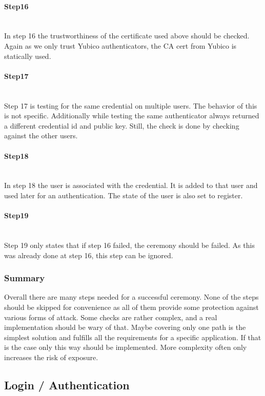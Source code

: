\documentclass[a4paper, 11pt]{scrartcl}
\begin{document}
\paragraph{Step16}\hfill \\ 
In step 16 the trustworthiness of the certificate used above should be checked. Again as we only trust Yubico authenticators, the CA cert from Yubico is statically used.

\paragraph{Step17}\hfill \\ 
Step 17 is testing for the same credential on multiple users. The behavior of this is not specific. Additionally while testing the same authenticator always returned a different credential id and public key. Still, the check is done by checking against the other users.

\paragraph{Step18}\hfill \\ 
In step 18 the user is associated with the credential. It is added to that user and used later for an authentication. The state of the user is also set to register. 

\paragraph{Step19}\hfill \\ 
Step 19 only states that if step 16 failed, the ceremony should be failed. As this was already done at step 16, this step can be ignored.

\subsubsection{Summary}
Overall there are many steps needed for a successful ceremony. None of the steps should be skipped for convenience as all of them provide some protection against various forms of attack. Some checks are rather complex, and a real implementation should be wary of that. Maybe covering only one path is the simplest solution and fulfills all the requirements for a specific application. If that is the case only this way should be implemented. More complexity often only increases the risk of exposure.

\subsection{Login / Authentication}
\end{document}
